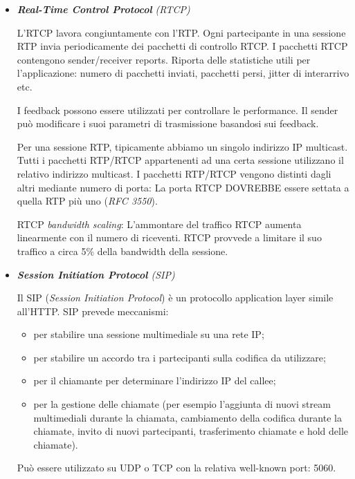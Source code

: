 \begin{itemize}
\begin{itemize}
\end{itemize}

\item{\textit{\textbf{Real-Time Control Protocol} (RTCP)}}

L'RTCP lavora congiuntamente con l'RTP. Ogni partecipante in una sessione RTP invia periodicamente dei pacchetti di controllo RTCP. I pacchetti RTCP contengono sender/receiver reports. Riporta delle statistiche utili per l'applicazione: numero di pacchetti inviati, pacchetti persi, jitter di interarrivo etc.

I feedback possono essere utilizzati per controllare le performance. Il sender può modificare i suoi parametri di trasmissione basandosi sui feedback.

Per una sessione RTP, tipicamente abbiamo un singolo indirizzo IP multicast. Tutti i pacchetti RTP/RTCP appartenenti ad una certa sessione utilizzano il relativo indirizzo multicast. I pacchetti RTP/RTCP vengono distinti dagli altri mediante numero di porta: La porta RTCP DOVREBBE essere settata a quella RTP più uno (\textit{RFC 3550}).

RTCP \textit{bandwidth scaling}: L'ammontare del traffico RTCP aumenta linearmente con il numero di riceventi. RTCP provvede a limitare il suo traffico a circa 5\% della bandwidth della sessione.

\item{\textit{\textbf{Session Initiation Protocol} (SIP)}}

Il SIP (\textit{Session Initiation Protocol}) è un protocollo application layer simile all'HTTP. SIP prevede meccanismi:

\begin{itemize}

\item per stabilire una sessione multimediale su una rete IP;
\item per stabilire un accordo tra i partecipanti sulla codifica da utilizzare;
\item per il chiamante per determinare l'indirizzo IP del callee;
\item per la gestione delle chiamate (per esempio l'aggiunta di nuovi stream multimediali durante la chiamata, cambiamento della codifica durante la chiamate, invito di nuovi partecipanti, trasferimento chiamate e hold delle chiamate).

\end{itemize}

Può essere utilizzato su UDP o TCP con la relativa well-known port: 5060.



\end{itemize}
